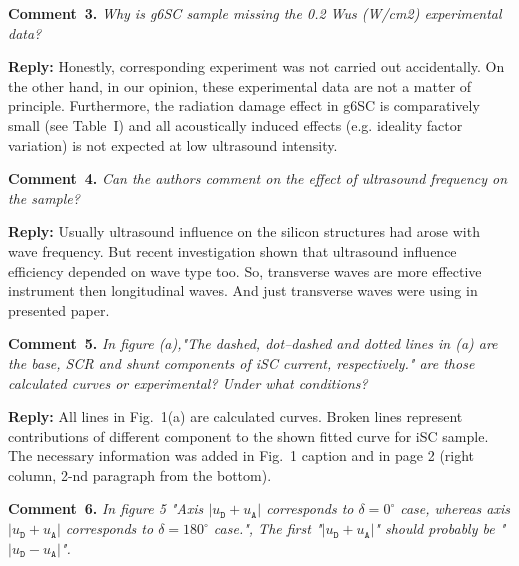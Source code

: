\documentclass[aip,jap,preprint]{revtex4-1}
\begin{document}
\vspace{1cm}
\noindent
\textcolor[rgb]{0.00,0.50,1.00}{\textbf{Comment~3.}}
\emph{ Why is g6SC sample missing the 0.2 Wus (W/cm2) experimental data?}

\noindent
\textcolor[rgb]{0.51,0.00,0.00}{\textbf{Reply:}}
Honestly, corresponding experiment was not carried out accidentally.
On the other hand, in our opinion, these experimental data are not a matter of principle.
Furthermore, the radiation damage effect in g6SC is comparatively small (see Table~I) and
all acoustically induced effects (e.g. ideality factor variation) is not expected at low ultrasound intensity.

\vspace{1cm}
\noindent
\textcolor[rgb]{0.00,0.50,1.00}{\textbf{Comment~4.}}
\emph{Can the authors comment on the effect of ultrasound frequency on the sample?}

\noindent
\textcolor[rgb]{0.51,0.00,0.00}{\textbf{Reply:}}
Usually ultrasound influence on the silicon structures had arose with wave frequency\cite{Olikh2011Sem,Olikh:Ultras2016}.
But recent investigation \cite{Olikh:inpress} shown that ultrasound influence efficiency depended on wave type too.
So, transverse waves are more effective instrument then longitudinal waves.
And just transverse waves were using in presented paper.


\vspace{1cm}
\noindent
\textcolor[rgb]{0.00,0.50,1.00}{\textbf{Comment~5.}}
\emph{In figure (a),"The dashed, dot--dashed and dotted lines in (a) are the base, SCR and shunt components of iSC current, respectively." are those calculated curves or experimental? Under what conditions?}

\noindent
\textcolor[rgb]{0.51,0.00,0.00}{\textbf{Reply:}}
All lines in Fig.~1(a) are calculated curves.
Broken lines represent contributions of different component to the shown fitted curve for iSC sample.
The necessary information was added in Fig.~1 caption and in page 2 (right column, 2-nd paragraph from the bottom).



\vspace{1cm}
\noindent
\textcolor[rgb]{0.00,0.50,1.00}{\textbf{Comment~6.}}
\emph{In figure 5 "Axis $|u_\mathtt{D}+u_\mathtt{A}|$ corresponds to $\delta=0^\circ$ case, whereas axis $|u_\mathtt{D}+u_\mathtt{A}|$ corresponds to $\delta=180^\circ$ case.", The first "$|u_\mathtt{D}+u_\mathtt{A}|$" should probably be "$|u_\mathtt{D}-u_\mathtt{A}|$".}
\end{document}
